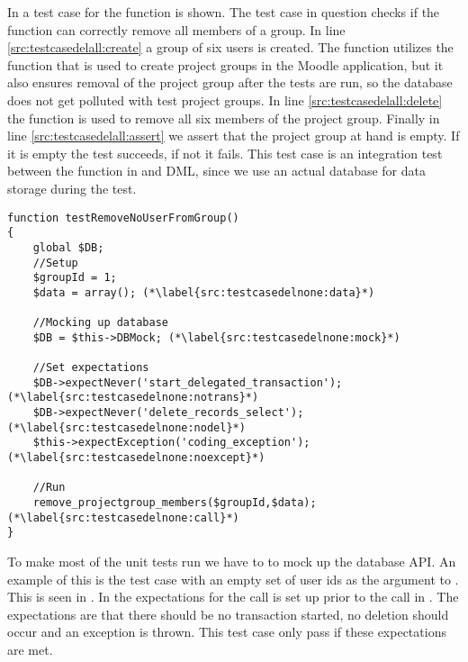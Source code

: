 In  a test case for the function  is shown.
The test case in question checks if the function can correctly remove all members of a group. 
In line \ref{src:testcasedelall:create} a group of six users is created.
The function  utilizes the function that is used to create project groups in the Moodle application, but it also ensures removal of the project group after the tests are run, so the database does not get polluted with test project groups.
In line \ref{src:testcasedelall:delete} the function  is used to remove all six members of the project group.
Finally in line \ref{src:testcasedelall:assert} we assert that the project group at hand is empty.
If it is empty the test succeeds, if not it fails.
This test case is an integration test between the function  in \admlib{} and \moodle{} DML, since we use an actual database for data storage during the test.


\begin{lstlisting}[style=phpCode, caption=\myCaption{A test case for the function \fu{remove\_projectgroup\_members}. The test case tests if the function correctly handles the erronous input of an empty set of users}, label=src:testcasedelnone]
function testRemoveNoUserFromGroup()
{
	global $DB;
	//Setup
	$groupId = 1;
	$data = array(); (*\label{src:testcasedelnone:data}*)
	
	//Mocking up database
	$DB = $this->DBMock; (*\label{src:testcasedelnone:mock}*)
	
	//Set expectations
	$DB->expectNever('start_delegated_transaction'); (*\label{src:testcasedelnone:notrans}*)
	$DB->expectNever('delete_records_select'); (*\label{src:testcasedelnone:nodel}*)
	$this->expectException('coding_exception'); (*\label{src:testcasedelnone:noexcept}*)
	
	//Run
	remove_projectgroup_members($groupId,$data); (*\label{src:testcasedelnone:call}*)
}
\end{lstlisting}
To make most of the unit tests run we have to to mock up the database API.
An example of this is the test case with an empty set of user ids as the argument \varuserids{} to .
This is seen in .
In  the expectations for the call is set up prior to the call in .
The expectations are that there should be no transaction started, no deletion should occur and an exception is thrown.
This test case only pass if these expectations are met.








